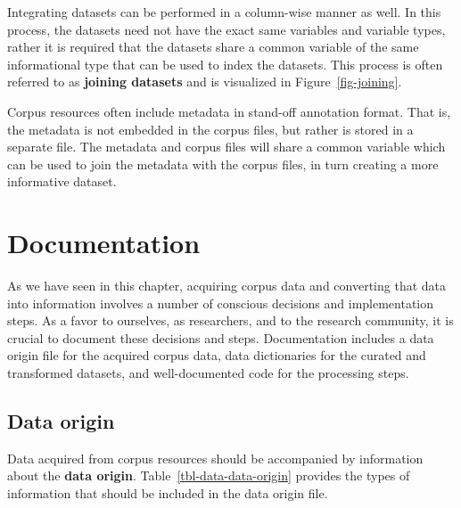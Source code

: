 \documentclass[
  letterpaper,
  krantz1]{latex/krantz-mod}
\theoremstyle{definition}
\theoremstyle{definition}
\theoremstyle{remark}
\begin{document}
Integrating datasets can be performed in a column-wise manner as well.
In this process, the datasets need not have the exact same variables and
variable types, rather it is required that the datasets share a common
variable of the same informational type that can be used to index the
datasets. This process is often referred to as \textbf{joining
datasets} and is visualized in
Figure~\ref{fig-joining}.

Corpus resources often include metadata in stand-off
annotation format. That is, the metadata is not embedded in the corpus
files, but rather is stored in a separate file. The metadata and corpus
files will share a common variable which can be used to join the
metadata with the corpus files, in turn creating a more informative
dataset.

\section{Documentation}\label{sec-data-documentation}

As we have seen in this chapter, acquiring corpus data and converting
that data into information involves a number of conscious decisions and
implementation steps. As a favor to ourselves, as researchers, and to
the research community, it is crucial to document these decisions and
steps. Documentation includes a data origin file for
the acquired corpus data, data dictionaries for
the curated and transformed datasets, and well-documented
code for the processing steps.

\subsection{Data origin}\label{sec-data-data-origin}

Data acquired from corpus resources should be
accompanied by information about the \textbf{data
origin}. Table~\ref{tbl-data-data-origin} provides
the types of information that should be included in the data origin
file.
\end{document}
